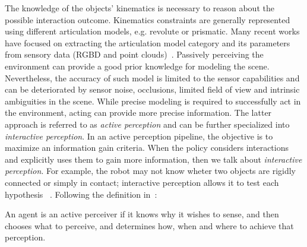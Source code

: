 The knowledge of the objects' kinematics is necessary to reason about the possible interaction outcome. Kinematics constraints are generally represented using different articulation models, e.g. revolute or prismatic. Many recent works have focused on extracting the articulation model category and its parameters from sensory data (RGBD and point clouds)~\cite{abbatematteo2019learning, li2020category}. 
Passively perceiving the environment can provide a good prior knowledge for modeling the scene. Nevertheless, the accuracy of such model is limited to the sensor capabilities and can be deteriorated by sensor noise, occlusions, limited field of view and intrinsic ambiguities in the scene. While precise modeling is required to successfully act in the environment, acting can provide more precise information. The latter approach is referred to as \emph{active perception} and can be further specialized into \emph{interactive perception}. In an active perception pipeline, the objective is to maximize an information gain criteria. When the policy considers interactions and explicitly uses them to gain more information, then we talk about \emph{interactive perception}. For example, the robot may not know wheter two objects are rigidly connected or simply in contact; interactive perception allows it to test each hypothesis ~\citep{kroemer2019review}. Following the definition in~\cite{bajcsy2018revisiting}:
\begin{displayquote}
An agent is an active perceiver if it knows why it wishes to sense, and then chooses what to perceive, and determines how, when and where to achieve that perception.
\end{displayquote}  


